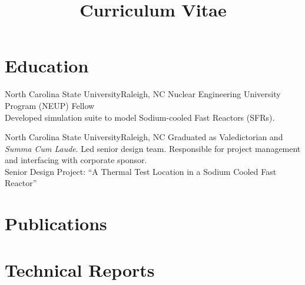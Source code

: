 \documentclass[letterpaper,11pt,nocolor,final]{moderncv}
\title{Curriculum Vitae}
\begin{document}
\maketitle

\nocite{*}


\section{Education}  

    {North Carolina State University}{Raleigh, NC}{}{
    Nuclear Engineering University Program (NEUP) Fellow \\
    Developed simulation suite to model Sodium-cooled Fast Reactors (SFRs).
    \vspace{-1\topsep}
    \printbibliography[keyword={mastersthesis},heading=none]}
  \vspace{\topsep}

    {North Carolina State University}{Raleigh, NC}{}{
    Graduated as Valedictorian and \textit{Summa Cum Laude}.
    Led senior design team. Responsible for project management and interfacing with corporate sponsor. \\
    Senior Design Project: ``A Thermal Test Location in a Sodium Cooled Fast Reactor''}


\section{Publications}
  \printbibliography[keyword={publications},heading=none]

\section{Technical Reports}
  \printbibliography[keyword={techreport},heading=none]


\end{document}
